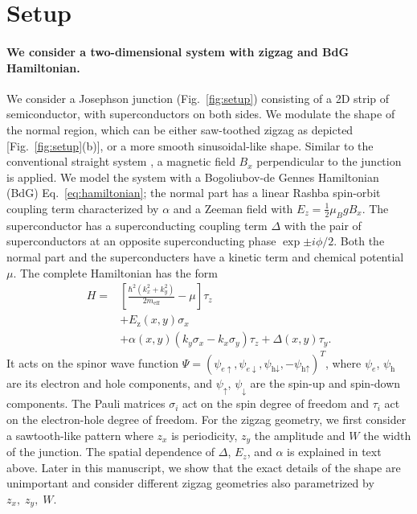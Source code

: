 \documentclass[english, twocolumn, 10pt, aps, superscriptaddress, floatfix, prb, citeautoscript]{revtex4-1}
\newcommand{\kx}{k_x}
\newcommand{\ky}{k_y}
\newcommand{\meff}{m_\text{eff}}
\renewcommand{\comment}[2]{#2}
\renewcommand{\comment}{\paragraph}
\begin{document}
\section{Setup}\label{sec:setup}

\comment{We consider a two-dimensional system with zigzag and BdG Hamiltonian.}
We consider a Josephson junction (Fig.~\ref{fig:setup}) consisting of a 2D strip of semiconductor, with superconductors on both sides.
We modulate the shape of the normal region, which can be either saw-toothed zigzag as depicted [Fig.~\ref{fig:setup}(b)], or a more smooth sinusoidal-like shape.
Similar to the conventional straight system \cite{pientka2017topological}, a magnetic field $B_x$ perpendicular to the junction is applied.
We model the system with a Bogoliubov-de Gennes Hamiltonian (BdG) Eq.~\eqref{eq:hamiltonian}; the normal part has a linear Rashba spin-orbit coupling term characterized by $\alpha$ and a Zeeman field with $E_z=\frac{1}{2} \mu_B g B_x$.
The superconductor has a superconducting coupling term $\Delta$ with the pair of superconductors at an opposite superconducting phase $\exp{\pm i \phi/2}$.
Both the normal part and the superconducters have a kinetic term and chemical potential $\mu$.
The complete Hamiltonian has the form
\begin{equation}
\begin{split}
    H = & \left[\frac{\hbar^2\left(\kx^2 + \ky^2\right)}{2\meff} - \mu\right] \tau_z \\
        & + E_\text{z}(x,y) \sigma_x \\
        & + \alpha(x,y) \left( \ky \sigma_x - \kx \sigma_y \right) \tau_z
          + \Delta(x,y) \tau_y.
\end{split}
\label{eq:hamiltonian}
\end{equation}
It acts on the spinor wave function $\Psi={\left(\psi_{e\uparrow},\psi_{e\downarrow},\psi_{\textrm{h}\downarrow},-\psi_{\textrm{h}\uparrow}\right)}^{T}$, where $\psi_e$, $\psi_\textrm{h}$ are its electron and hole components, and $\psi_\uparrow$, $\psi_\downarrow$ are the spin-up and spin-down components.
The Pauli matrices $\sigma_{i}$ act on the spin degree of freedom and $\tau_{i}$ act on the electron-hole degree of freedom.
For the zigzag geometry, we first consider a sawtooth-like pattern where $z_x$ is periodicity, $z_y$ the amplitude and $W$ the width of the junction.
The spatial dependence of $\Delta$, $E_z$, and $\alpha$ is explained in text above.
Later in this manuscript, we show that the exact details of the shape are unimportant and consider different zigzag geometries also parametrized by $z_x, \; z_y, \; W$.
\end{document}
